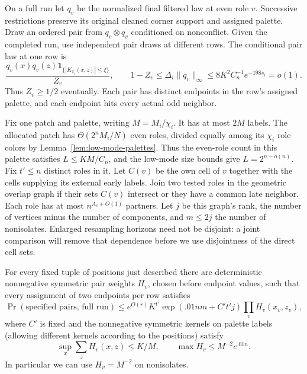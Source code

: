 On a full run let \(q_v\) be the normalized final filtered law at
even role \(v\). Successive restrictions preserve its original cleaned
corner support and assigned palette. Draw an ordered pair from
\(q_v\otimes q_v\)
conditioned on nonconflict. Given the completed run, use independent
pair draws at different rows. The conditional pair law at one row is
\[
 \frac{q_v(x)q_v(z)\mathbf1_{\{|K_{\pi_i}(x,z)|\le\xi\}}}{Z_v},
 \qquad
 1-Z_v\le\Delta_i\|q_v\|_\infty
 \le8K^2C_n^{-1}e^{-198s_i}=o(1).
\]
Thus \(Z_v\ge1/2\) eventually. Each pair has distinct endpoints in
the row's assigned palette, and each endpoint hits every actual odd
neighbor.

Fix one patch and palette, writing \(M=M_i/\chi_i\). It has at
most \(2M\) labels. The allocated patch has
\(\Theta(2^nM_i/N)\) even roles, divided equally among its
\(\chi_i\) role colors by Lemma~\ref{lem:low-mode-palettes}.
Thus the even-role count in this palette satisfies
\(L\le KM/C_n\), and the low-mode size bounds give
\(L=2^{n-o(n)}\). Fix \(t'\le n\) distinct
roles in it. Let \(C(v)\) be the own cell of \(v\) together with
the cells supplying its external early labels. Join two tested roles
in the geometric overlap graph if their sets \(C(v)\) intersect or
they have a common late neighbor. Each role has at most
\(n^{A_c+O(1)}\) partners. Let \(j\) be this graph's rank, the
number of vertices minus the number of components, and \(m\le2j\)
the number of nonisolates. Enlarged resampling horizons need not be
disjoint: a joint comparison will remove that dependence before we
use disjointness of the direct cell sets.

\begin{proposition}\label{prop:low-endpoint-kernels}
For every fixed tuple of positions just described there are deterministic
nonnegative symmetric pair weights \(H_v\), chosen before endpoint
values, such that every assignment of two endpoints per row satisfies
\begin{equation}
 \Pr(\text{specified pairs, full run})\le e^{O(r)} K^{t'}
       \exp(.01 n m+C' t'j)\prod_v H_v(x_v,z_v),                  \label{eq:source-28}
\end{equation}
where \(C'\) is fixed and the nonnegative symmetric kernels on palette labels (allowing different kernels according to the positions) satisfy
\[
 \sup_x\sum_z H_v(x,z)\le K/M,\qquad \max H_v\le M^{-2}e^{.01n}.
\]
In particular we can use \(H_v=M^{-2}\) on nonisolates.
\end{proposition}

